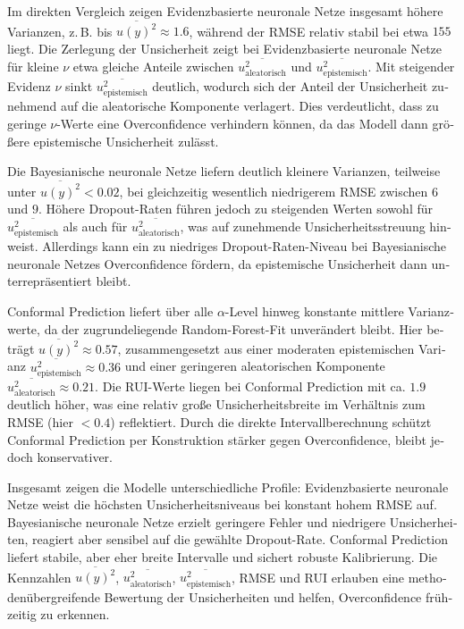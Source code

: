 \begin{otherlanguage}{ngerman}
Im direkten Vergleich zeigen \gls{Evidenzbasierte neuronale Netze} insgesamt höhere Varianzen, z.\,B. bis \(\overline{u(y)^2} \approx 1.6\), während der RMSE relativ stabil bei etwa \(155\) liegt. Die Zerlegung der Unsicherheit zeigt bei \gls{Evidenzbasierte neuronale Netze} für kleine \(\nu\) etwa gleiche Anteile zwischen \(\overline{u_{\text{aleatorisch}}^2}\) und \(\overline{u_{\text{epistemisch}}^2}\). Mit steigender Evidenz \(\nu\) sinkt \(\overline{u_{\text{epistemisch}}^2}\) deutlich, wodurch sich der Anteil der Unsicherheit zunehmend auf die aleatorische Komponente verlagert. Dies verdeutlicht, dass zu geringe \(\nu\)-Werte eine Overconfidence verhindern können, da das Modell dann größere epistemische Unsicherheit zulässt.  

Die \gls{Bayesianische neuronale Netze} liefern deutlich kleinere Varianzen, teilweise unter \(\overline{u(y)^2} < 0.02\), bei gleichzeitig wesentlich niedrigerem RMSE zwischen \(6\) und \(9\). Höhere Dropout-Raten führen jedoch zu steigenden Werten sowohl für \(\overline{u_{\text{epistemisch}}^2}\) als auch für \(\overline{u_{\text{aleatorisch}}^2}\), was auf zunehmende Unsicherheitsstreuung hinweist. Allerdings kann ein zu niedriges Dropout-Raten-Niveau bei \gls{Bayesianische neuronale Netze}s Overconfidence fördern, da epistemische Unsicherheit dann unterrepräsentiert bleibt.  

\gls{Conformal Prediction} liefert über alle \(\alpha\)-Level hinweg konstante mittlere Varianzwerte, da der zugrundeliegende Random-Forest-Fit unverändert bleibt. Hier beträgt \(\overline{u(y)^2} \approx 0.57\), zusammengesetzt aus einer moderaten epistemischen Varianz \(\overline{u_{\text{epistemisch}}^2} \approx 0.36\) und einer geringeren aleatorischen Komponente \(\overline{u_{\text{aleatorisch}}^2} \approx 0.21\). Die RUI-Werte liegen bei \gls{Conformal Prediction} mit ca. \(1.9\) deutlich höher, was eine relativ große Unsicherheitsbreite im Verhältnis zum RMSE (hier \(< 0.4\)) reflektiert. Durch die direkte Intervallberechnung schützt \gls{Conformal Prediction} per Konstruktion stärker gegen Overconfidence, bleibt jedoch konservativer.  

Insgesamt zeigen die Modelle unterschiedliche Profile: \gls{Evidenzbasierte neuronale Netze} weist die höchsten Unsicherheitsniveaus bei konstant hohem RMSE auf. \gls{Bayesianische neuronale Netze} erzielt geringere Fehler und niedrigere Unsicherheiten, reagiert aber sensibel auf die gewählte Dropout-Rate. \gls{Conformal Prediction} liefert stabile, aber eher breite Intervalle und sichert robuste Kalibrierung. Die Kennzahlen \(\overline{u(y)^2}\), \(\overline{u_{\text{aleatorisch}}^2}\), \(\overline{u_{\text{epistemisch}}^2}\), RMSE und RUI erlauben eine methodenübergreifende Bewertung der Unsicherheiten und helfen, Overconfidence frühzeitig zu erkennen.




\end{otherlanguage}
